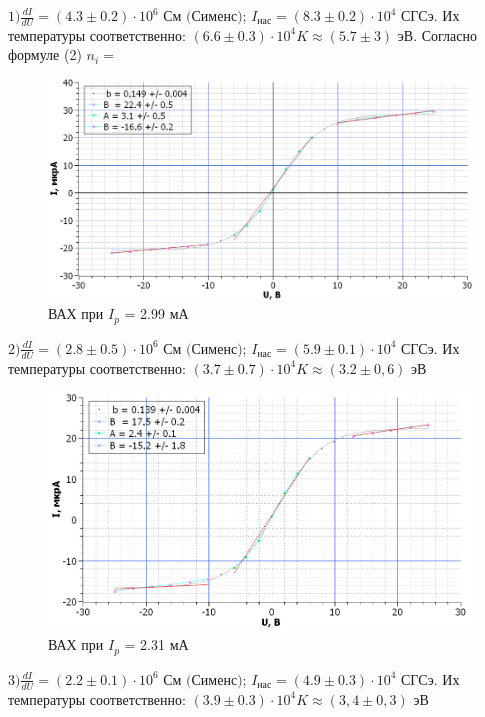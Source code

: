 \begin{enumerate}
\par $1) \frac{dI}{dU} = (4.3 \pm 0.2) \cdot 10^6 \text{ См (Сименс)}$;
    $I_{\text{нас}} = (8.3 \pm 0.2) \cdot 10^4 \text{ СГСэ}$. \newline
Их температуры соответственно: $(6.6 \pm 0.3) \cdot 10^4 K \approx (5.7 \pm 3) \text{ эВ}$.
Согласно формуле (2) $n_i = $

\begin{figure}[h!]
    \centering
    \includegraphics[scale=0.7]{ВАХ_299.png}
    \caption{ВАХ при $I_p$ = 2.99 мА}
    \label{fig:ref_to_this_foto}
\end{figure}

\par $2) \frac{dI}{dU} = (2.8 \pm 0.5) \cdot 10^6 \text{ См (Сименс)}$;
    $I_{\text{нас}} = (5.9 \pm 0.1) \cdot 10^4 \text{ СГСэ}$. \newline
Их температуры соответственно: $(3.7 \pm 0.7) \cdot 10^4 K \approx (3.2 \pm 0,6) \text{ эВ}$
\newline
\begin{figure}[h!]
    \centering
    \includegraphics[scale=0.7]{ВАХ_231.png}
    \caption{ВАХ при $I_p$ = 2.31 мА}
    \label{fig:ref_to_this_foto}
\end{figure}

\par $3) \frac{dI}{dU} = (2.2 \pm 0.1) \cdot 10^6 \text{ См (Сименс)}$;
    $I_{\text{нас}} = (4.9 \pm 0.3) \cdot 10^4 \text{ СГСэ}$. \newline
Их температуры соответственно: $(3.9 \pm 0.3) \cdot 10^4 K \approx (3,4 \pm 0,3) \text{ эВ}$

\end{enumerate}
\newpage

